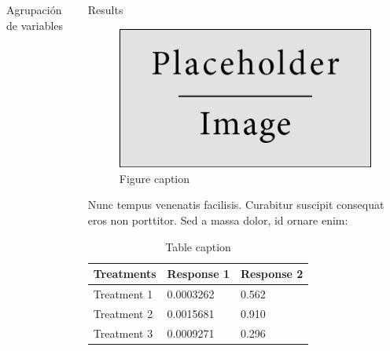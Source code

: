 \documentclass[final]{beamer}
\newlength{\onecolwid}
\newlength{\twocolwid}
\begin{document}
\begin{frame}[t]
\begin{columns}[t]
\begin{column}{\twocolwid}
\begin{columns}[t,totalwidth=\twocolwid]
\begin{column}{\onecolwid}
\begin{block}{Agrupación de variables}
\end{block}


\end{column} %

\begin{column}{\onecolwid} %


\begin{block}{Results}

\begin{figure}
\includegraphics[width=0.8\linewidth]{placeholder.jpg}
\caption{Figure caption}
\end{figure}

Nunc tempus venenatis facilisis. Curabitur suscipit consequat eros non porttitor. Sed a massa dolor, id ornare enim:

\begin{table}
\vspace{2ex}
\begin{tabular}{l l l}
\toprule
\textbf{Treatments} & \textbf{Response 1} & \textbf{Response 2}\\
\midrule
Treatment 1 & 0.0003262 & 0.562 \\
Treatment 2 & 0.0015681 & 0.910 \\
Treatment 3 & 0.0009271 & 0.296 \\
\bottomrule
\end{tabular}
\caption{Table caption}
\end{table}

\end{block}



\end{column}
\end{columns}
\end{column}
\end{columns}
\end{frame}
\end{document}
